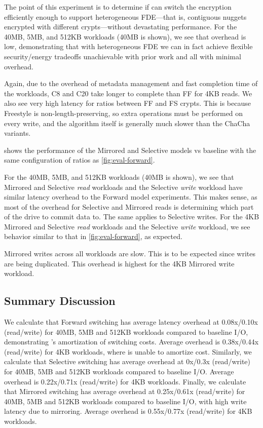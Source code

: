 

The point of this experiment is to determine if \sys can switch the encryption
efficiently enough to support heterogeneous FDE---that is, contiguous nuggets
encrypted with different crypts---without devastating performance. For the 40MB,
5MB, and 512KB workloads (40MB is shown), we see that overhead is low,
demonstrating that with heterogeneous FDE we can in fact achieve flexible
security/energy tradeoffs unachievable with prior work and all with minimal
overhead.

Again, due to the overhead of metadata management and fast completion time of
the workloads, C8 and C20 take longer to complete than FF for 4KB reads. We also
see very high latency for ratios between FF and FS crypts. This is because
Freestyle is non-length-preserving, so extra operations must be performed on
every write, and the algorithm itself is generally much slower than the ChaCha
variants.

 shows the performance of the Mirrored and Selective models vs
baseline with the same configuration of ratios as \cref{fig:eval-forward}.

For the 40MB, 5MB, and 512KB workloads (40MB is shown), we see that Mirrored and
Selective {\em read} workloads and the Selective {\em write} workload have
similar latency overhead to the Forward model experiments. This makes sense, as
most of the overhead for Selective and Mirrored reads is determining which part
of the drive to commit data to. The same applies to Selective writes. For the
4KB Mirrored and Selective {\em read} workloads and the Selective {\em write}
workload, we see behavior similar to that in \cref{fig:eval-forward}, as
expected.

Mirrored writes across all workloads are slow. This is to be expected since
writes are being duplicated. This overhead is highest for the 4KB Mirrored write
workload.


\subsection{Summary Discussion}\label{subsec:eval-overhead}

We calculate that Forward switching has average latency overhead at 0.08x/0.10x
(read/write) for 40MB, 5MB and 512KB workloads compared to baseline I/O,
demonstrating \sys's amortization of switching costs. Average overhead is
0.38x/0.44x (read/write) for 4KB workloads, where \sys is unable to amortize
cost. Similarly, we calculate that Selective switching has average overhead at
0x/0.3x (read/write) for 40MB, 5MB and 512KB workloads compared to baseline I/O.
Average overhead is 0.22x/0.71x (read/write) for 4KB workloads. Finally, we
calculate that Mirrored switching has average overhead at 0.25x/0.61x
(read/write) for 40MB, 5MB and 512KB workloads compared to baseline I/O, with
high write latency due to mirroring. Average overhead is 0.55x/0.77x
(read/write) for 4KB workloads.

